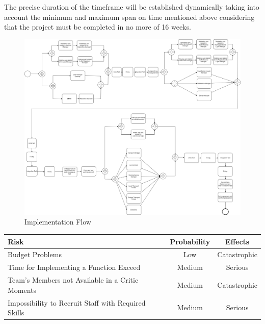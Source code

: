 The precise duration of the timeframe will be established dynamically taking into account the minimum and maximum span on time mentioned above considering that the project must be completed in no more of 16 weeks.

\begin{figure}[H]
	\centering
	\includegraphics[scale=0.22]{Images/Implementation/Implementation_Flow}
	\caption{Implementation Flow}
\end{figure}

\begin{tabular}[H]{p{7cm}|c|c}
	Risk & Probability & Effects\\
	\hline
	\rule{0pt}{4ex} Budget Problems & Low & Catastrophic\\
	\hline
	\rule{0pt}{4ex} Time for Implementing a Function Exceed & Medium & Serious\\
	\hline
	\rule{0pt}{4ex} Team’s Members not Available in a Critic Moments & Medium & Catastrophic\\
	\hline
	\rule{0pt}{4ex} Impossibility to Recruit Staff with Required Skills & Medium & Serious
\end{tabular}

